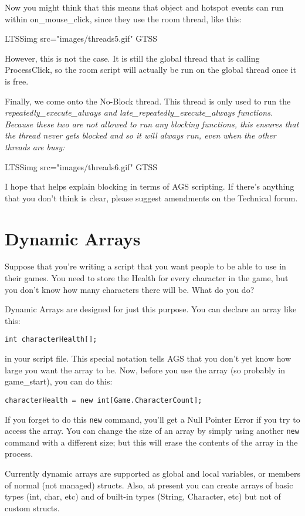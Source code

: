 Now you might think that this means that object and hotspot events can run within
on_mouse_click, since they use the room thread, like this:

LTSSimg src="images/threads5.gif" GTSS

However, this is not the case. It is still the global thread that is calling ProcessClick,
so the room script will actually be run on the global thread once it is free.

Finally, we come onto the No-Block thread. This thread is only used to run the
\it{repeatedly_execute_always} and \it{late_repeatedly_execute_always} functions. Because these two are not
allowed to run any blocking functions, this ensures that the thread never gets blocked
and so it will always run, even when the other threads are busy:

LTSSimg src="images/threads6.gif" GTSS

I hope that helps explain blocking in terms of AGS scripting. If there's anything that
you don't think is clear, please suggest amendments on the Technical forum.


\section{Dynamic Arrays}\label{DynamicArrays}%

Suppose that you're writing a script that you want people to be able
to use in their games. You need to store the Health for every character
in the game, but you don't know how many characters there will be. What do you do?

Dynamic Arrays are designed for just this purpose. You can declare an array like this:

\verb$int characterHealth[];$

in your script file. This special notation tells AGS that you don't yet know how large
you want the array to be. Now, before you use the array (so probably in game_start),
you can do this:

\verb$characterHealth = new int[Game.CharacterCount];$

If you forget to do this \verb$new$ command, you'll get a Null Pointer Error if you try
to access the array. You can change the size of an array by simply using another
\verb$new$ command with a different size; but this will erase the contents of the
array in the process.

Currently dynamic arrays are supported as global and local variables, or members of
normal (not managed) structs.
Also, at present you can create arrays of basic types (int, char, etc) and
of built-in types (String, Character, etc) but not of custom structs.


